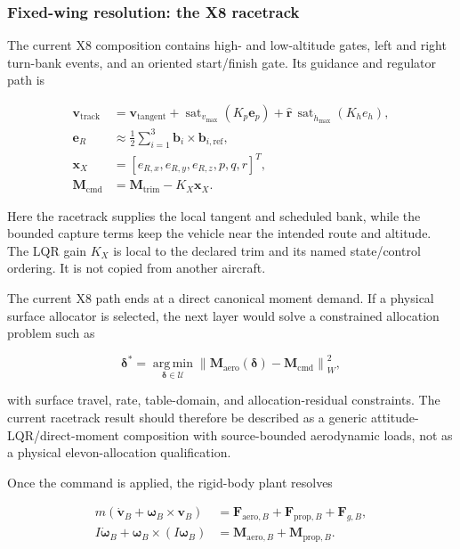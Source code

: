 \documentclass[11pt]{article}
\begin{document}
\subsubsection{Fixed-wing resolution: the X8 racetrack}

The current X8 composition contains high- and low-altitude gates, left and
right turn-bank events, and an oriented start/finish gate. Its guidance and
regulator path is

\[
\begin{split}
  \boldsymbol v_{\mathrm{track}} &=
    \boldsymbol v_{\mathrm{tangent}}
    +\operatorname{sat}_{v_{\max}}(K_p\boldsymbol e_p)
    +\hat{\boldsymbol r}\,\operatorname{sat}_{\dot h_{\max}}(K_h e_h),\\
  \boldsymbol e_R &\approx \frac{1}{2}
    \sum_{i=1}^{3}\boldsymbol b_i\times\boldsymbol b_{i,\mathrm{ref}},\\
  \boldsymbol x_X &=[e_{R,x},e_{R,y},e_{R,z},p,q,r]^T,\\
  \boldsymbol M_{\mathrm{cmd}} &=
    \boldsymbol M_{\mathrm{trim}}-K_X\boldsymbol x_X.
\end{split}
\]

Here the racetrack supplies the local tangent and scheduled bank, while the
bounded capture terms keep the vehicle near the intended route and altitude.
The LQR gain $K_X$ is local to the declared trim and its named state/control
ordering. It is not copied from another aircraft.

The current X8 path ends at a direct canonical moment demand. If a physical
surface allocator is selected, the next layer would solve a constrained
allocation problem such as

\[
  \boldsymbol\delta^{*}=
  \underset{\boldsymbol\delta\in\mathcal U}{\operatorname{arg\,min}}
  \left\|\boldsymbol M_{\mathrm{aero}}(\boldsymbol\delta)
  -\boldsymbol M_{\mathrm{cmd}}\right\|_{W}^{2},
\]

with surface travel, rate, table-domain, and allocation-residual constraints.
The current racetrack result should therefore be described as a generic
attitude-LQR/direct-moment composition with source-bounded aerodynamic loads,
not as a physical elevon-allocation qualification.

Once the command is applied, the rigid-body plant resolves

\[
\begin{aligned}
  m(\dot{\boldsymbol v}_B+\boldsymbol\omega_B\times\boldsymbol v_B)
    &=\boldsymbol F_{\mathrm{aero},B}+\boldsymbol F_{\mathrm{prop},B}
      +\boldsymbol F_{g,B},\\
  I\dot{\boldsymbol\omega}_B
    +\boldsymbol\omega_B\times(I\boldsymbol\omega_B)
    &=\boldsymbol M_{\mathrm{aero},B}+\boldsymbol M_{\mathrm{prop},B}.
\end{aligned}
\]
\end{document}
